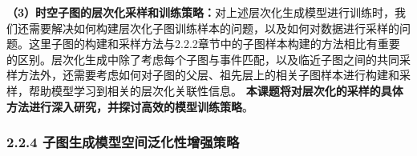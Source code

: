 \documentclass[12pt,UTF8,AutoFakeBold=2,a4paper]{ctexart} %
\begin{document}


\textbf{（3）时空子图的层次化采样和训练策略：}对上述层次化生成模型进行训练时，我们还需要解决如何构建层次化子图训练样本的问题，以及如何对数据进行采样的问题。这里子图的构建和采样方法与2.2.2章节中的子图样本构建的方法相比有重要的区别。层次化生成中除了考虑每个子图与事件匹配，以及临近子图之间的共同采样方法外，还需要考虑如何对子图的父层、祖先层上的相关子图样本进行构建和采样，帮助模型学习到相关的层次化关联性信息。%
\textbf{本课题将对层次化的采样的具体方法进行深入研究，并探讨高效的模型训练策略}。
%
%
\subsubsection{2.2.4 子图生成模型空间泛化性增强策略}
\end{document}
